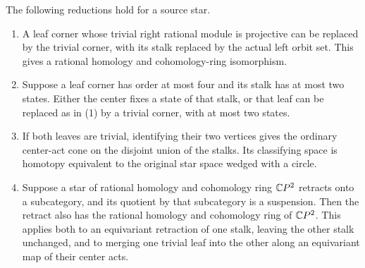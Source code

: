 \begin{lemma}
\label{CP2:A-star-leaf-reductions}
The following reductions hold for a source star.
\begin{enumerate}
\item A leaf corner whose trivial right rational module is
projective can be replaced by the trivial corner, with its
stalk replaced by the actual left orbit set. This gives a
rational homology and cohomology-ring isomorphism.
\item Suppose a leaf corner has order at most four and its
stalk has at most two states. Either the center fixes a
state of that stalk, or that leaf can be replaced as in (1)
by a trivial corner, with at most two states.
\item If both leaves are trivial, identifying their two
vertices gives the ordinary center-act cone on the disjoint
union of the stalks. Its classifying space is homotopy
equivalent to the original star space wedged with a circle.
\item Suppose a star of rational homology and cohomology
ring $\mathbb{C}P^2$ retracts onto a subcategory, and its quotient
by that subcategory is a suspension. Then the retract also
has the rational homology and cohomology ring of $\mathbb{C}P^2$.
This applies both to an equivariant retraction of one
stalk, leaving the other stalk unchanged, and to merging
one trivial leaf into the other along an equivariant map
of their center acts.
\end{enumerate}
\end{lemma}
